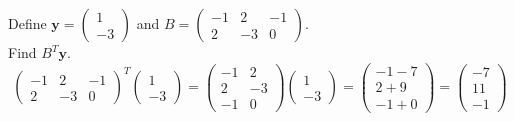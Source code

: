 \documentclass[11pt,a4paper]{article}
\begin{document}
\question

\qpart
Define $\textbf{y}=\begin{pmatrix}1\\-3\end{pmatrix}$ and $B=\begin{pmatrix}-1&2&-1\\2&-3&0\end{pmatrix}$.\\
Find $B^T\textbf{y}$.\\
$$\begin{pmatrix}-1&2&-1\\2&-3&0\end{pmatrix}^T\begin{pmatrix}1\\-3\end{pmatrix}=\begin{pmatrix}
-1&2\\2&-3\\-1&0\end{pmatrix}\begin{pmatrix}1\\-3\end{pmatrix}=\begin{pmatrix}-1-7\\2+9\\-1+0\end{pmatrix}=\begin{pmatrix}-7\\11\\-1\end{pmatrix}$$

\apart
\end{document}
